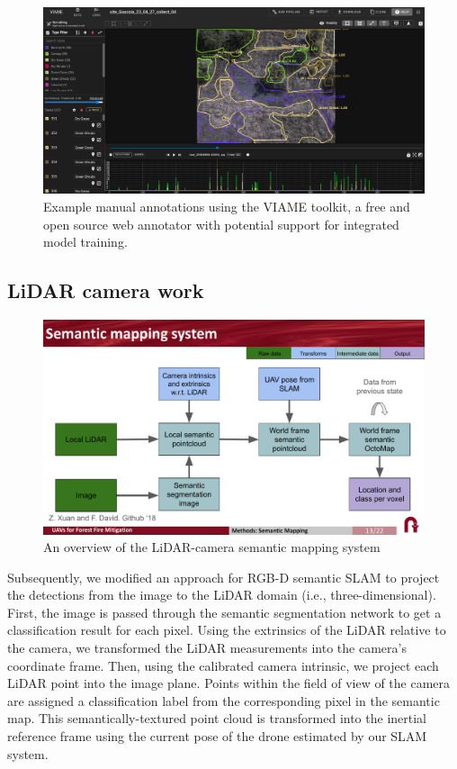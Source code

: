 \begin{figure}
    \centering
    \includegraphics[width=\textwidth]{figs/methods/semantic_mapping/viame_example.png}
    \caption{Example manual annotations using the VIAME toolkit, a free and open source web annotator with potential support for integrated model training.}
    \label{fig:methods:manual-annotations}
\end{figure}


\subsection{LiDAR camera work}

\begin{figure}
    \centering
    \includegraphics[width=\textwidth, clip, trim={0 1.5cm 0 1.8cm}]{figs/methods/semantic_mapping/semantic_mapping_overview.pdf}
    \caption{An overview of the LiDAR-camera semantic mapping system}
    \label{fig:lidar-camera-semantic-mapping}
\end{figure}

Subsequently, we modified an approach for RGB-D semantic SLAM \cite{semantic_slam} to project the detections from the image to the LiDAR domain (i.e., three-dimensional). First, the image is passed through the semantic segmentation network to get a classification result for each pixel. Using the extrinsics of the LiDAR relative to the camera, we transformed the LiDAR measurements into the camera's coordinate frame. Then, using the calibrated camera intrinsic, we project each LiDAR point into the image plane. Points within the field of view of the camera are assigned a classification label from the corresponding pixel in the semantic map. This semantically-textured point cloud is transformed into the inertial reference frame using the current pose of the drone estimated by our SLAM system. 

